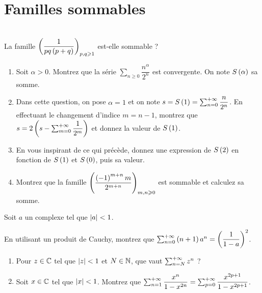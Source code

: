\chapter{Familles sommables}

\legendeexercices

\begin{exoss}[Exercice 23]~\\
La famille \(\left(\dfrac{1}{pq\left(p+q\right)}\right)_{p,q\geqslant1}\) est-elle sommable ?
\end{exoss}



\begin{exoss}[Exercice 24]
\begin{enumerate}
    \item Soit \(\alpha>0\). Montrez que la série \(\sum_{n\geq0}\dfrac{n^\alpha}{2^n}\) est convergente. On note \(S\left(\alpha\right)\) sa somme. \\
    \item Dans cette question, on pose \(\alpha=1\) et on note \(s=S\left(1\right)=\sum_{n=0}^{+\infty}\dfrac{n}{2^n}\). En effectuant le changement d'indice \(m=n-1\), montrez que \(s=2\left(s-\sum_{m=0}^{+\infty}\dfrac{1}{2^m}\right)\) et donnez la valeur de \(S\left(1\right)\). \\
    \item En vous inspirant de ce qui précède, donnez une expression de \(S\left(2\right)\) en fonction de \(S\left(1\right)\) et \(S\left(0\right)\), puis sa valeur. \\
    \item Montrez que la famille \(\left(\dfrac{\left(-1\right)^{m+n}m}{2^{m+n}}\right)_{m,n\geqslant0}\) est sommable et calculez sa somme.
\end{enumerate}
\end{exoss}



\begin{exoss}[Exercice 25]
Soit \(a\) un complexe tel que \(\left\lvert a\right\rvert<1\).

En utilisant un produit de Cauchy, montrez que \(\sum_{n=0}^{+\infty}\left(n+1\right)a^n=\left(\dfrac{1}{1-a}\right)^2\).
\end{exoss}



\begin{exoss}[Exercice 26]
\begin{enumerate}
    \item Pour \(z\in\mathbb{C}\) tel que \(\left\lvert z\right\rvert<1\) et \(N\in\mathbb{N}\), que vaut \(\sum_{n=N}^{+\infty}z^n\) ? \\
    \item Soit \(x\in\mathbb{C}\) tel que \(\left\lvert x\right\rvert<1\). Montrez que \(\sum_{n=1}^{+\infty}\dfrac{x^n}{1-x^{2n}}=\sum_{p=0}^{+\infty}\dfrac{x^{2p+1}}{1-x^{2p+1}}\).
\end{enumerate}
\end{exoss}



